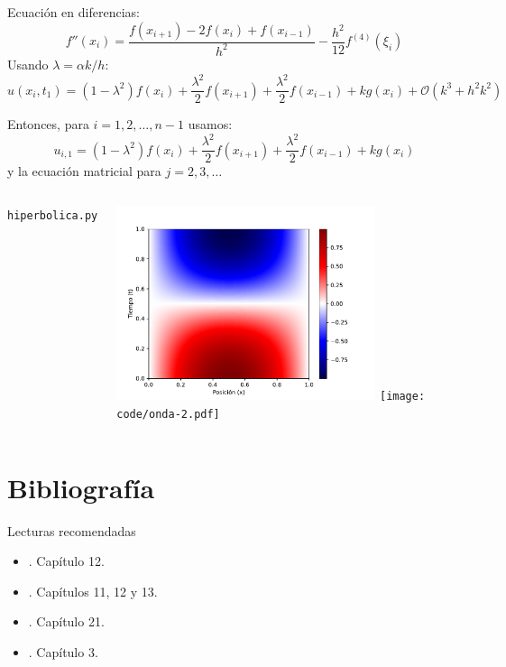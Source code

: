 \documentclass[9pt, aspectratio=169]{beamer}
\begin{document}
\begin{frame}
Ecuación en diferencias:
\[ f''(x_i) = \frac{f(x_{i+1}) - 2 f(x_i) + f(x_{i-1})}{h^2} - \frac{h^2}{12} f^{(4)}(\xi_i) \]
Usando $\lambda = \alpha k / h$:
\[ u(x_i, t_1) = (1-\lambda^2)f(x_i) + \frac{\lambda^2}{2} f(x_{i+1}) + \frac{\lambda^2}{2} f(x_{i-1}) + k g(x_i) + \mathcal{O}(k^3 + h^2 k^2) \]

Entonces, para $i = 1, 2, \ldots, n-1$ usamos:
\[ u_{i, 1} = (1-\lambda^2)f(x_i) + \frac{\lambda^2}{2} f(x_{i+1}) + \frac{\lambda^2}{2} f(x_{i-1}) + k g(x_i) \]
y la ecuación matricial para $j = 2, 3, \ldots$

\end{frame}

\begin{frame}
\begin{columns}
\texttt{hiperbolica.py} \vspace{-1em}
\pause

\begin{center}
    \includegraphics[width=0.75\textwidth]{code/onda-1.pdf}
    \texttt{[image: code/onda-2.pdf]}
\end{center}
\end{columns}
\end{frame}

\section*{Bibliografía}
\begin{frame}{Lecturas recomendadas}
\begin{itemize}
    \item {}. Capítulo 12.
    \item {}. Capítulos 11, 12 y 13.
\item {}. Capítulo 21.
    \item {}. Capítulo 3.
\end{itemize}
\end{frame}
\end{document}

